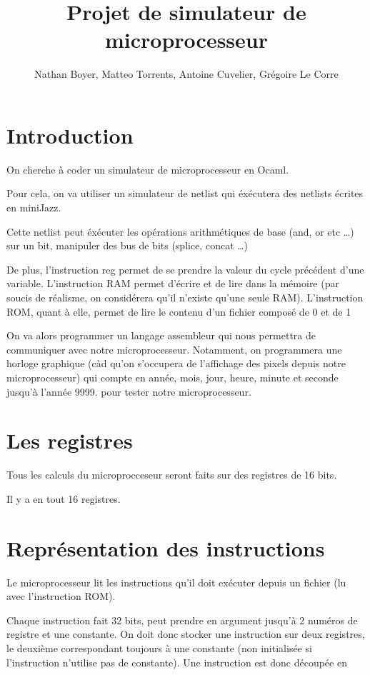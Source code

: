 \documentclass[12pt,a4paper,french]{article}
\title{Projet de simulateur de microprocesseur}
\author{Nathan Boyer, Matteo Torrents, Antoine Cuvelier, Grégoire Le Corre}
\begin{document}
\maketitle

\section*{Introduction}

On cherche à coder un simulateur de microprocesseur en Ocaml.

Pour cela, on va utiliser un simulateur de netlist qui éxécutera des netlists écrites en miniJazz.

Cette netlist peut éxécuter les opérations arithmétiques de base (and, or etc \ldots) sur un bit, manipuler des bus de bits (splice, concat \ldots)

De plus, l'instruction reg permet de se prendre la valeur du cycle précédent d'une variable. L'instruction RAM permet d'écrire et de lire dans la mémoire
(par soucis de réalisme, on considérera qu'il n'existe qu'une seule RAM). L'instruction ROM, quant à elle, permet de lire le contenu d'un fichier composé de 0 et de 1

On va alors programmer un langage assembleur qui nous permettra de communiquer avec notre microprocesseur. Notamment, on programmera une horloge graphique (càd qu'on s'occupera
de l'affichage des pixels depuis notre microprocesseur) qui compte en année, mois, jour, heure, minute et seconde jusqu'à l'année 9999.
pour tester notre microprocesseur.


\section{Les registres}

Tous les calculs du microprocceseur seront faits sur des registres de 16 bits.

Il y a en tout 16 registres.


\section{Représentation des instructions}

Le microprocesseur lit les instructions qu'il doit exécuter depuis un fichier (lu avec l'instruction ROM).

Chaque instruction fait 32 bits, peut prendre en argument jusqu'à 2 numéros de registre et une constante. On doit donc stocker une instruction sur deux registres, le deuxième correspondant toujours à une constante (non initialisée si l'instruction n'utilise pas de constante). Une instruction est donc découpée en 
\end{document}
